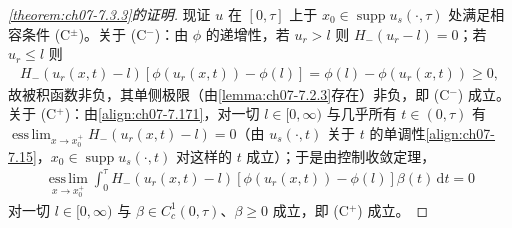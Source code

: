 \documentclass[../../main.tex]{subfiles}%
\begin{document}
\begin{proof}[\cref{theorem:ch07-7.3.3}的证明]
现证 $u$ 在 $[0,\tau]$ 上于 $x_0\in\operatorname{supp}u_s(\cdot,\tau)$ 处满足相容条件 (C$^\pm$)。关于 (C$^-$)：由 $\phi$ 的递增性，若 $u_r>l$ 则 $H_-(u_r-l)=0$；若 $u_r\leqslant l$ 则
\begin{align*}
H_-(u_r(x,t)-l)[\phi(u_r(x,t))-\phi(l)]=\phi(l)-\phi(u_r(x,t))\geqslant0,
\end{align*}
故被积函数非负，其单侧极限（由\cref{lemma:ch07-7.2.3}存在）非负，即 (C$^-$) 成立。关于 (C$^+$)：由\eqref{align:ch07-7.171}，对一切 $l\in[0,\infty)$ 与几乎所有 $t\in(0,\tau)$ 有 $\operatorname*{ess\,lim}_{x\to x_0^+}H_-(u_r(x,t)-l)=0$（由 $u_s(\cdot,t)$ 关于 $t$ 的单调性\eqref{align:ch07-7.15}，$x_0\in\operatorname{supp}u_s(\cdot,t)$ 对这样的 $t$ 成立）；于是由控制收敛定理，
\begin{align*}
\operatorname*{ess\,lim}_{x\to x_0^+}\int_0^\tau H_-(u_r(x,t)-l)[\phi(u_r(x,t))-\phi(l)]\beta(t)\,\mathrm{d}t=0
\end{align*}
对一切 $l\in[0,\infty)$ 与 $\beta\in C_c^1(0,\tau)$、$\beta\geqslant0$ 成立，即 (C$^+$) 成立。


\end{proof}
\end{document}
